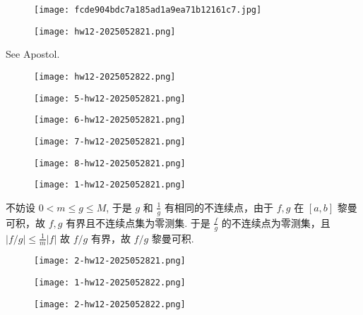 \begin{figure}[H]
\centering
\texttt{[image: fcde904bdc7a185ad1a9ea71b12161c7.jpg]}
\label{}
\end{figure}

\begin{exercise}
\begin{figure}[H]
\centering
\texttt{[image: hw12-2025052821.png]}
\label{}
\end{figure}
\end{exercise}
See Apostol.
\begin{figure}[H]
\centering
\texttt{[image: hw12-2025052822.png]}
\label{}
\end{figure}

\begin{figure}[H]
\centering
\texttt{[image: 5-hw12-2025052821.png]}
\label{}
\end{figure}
\begin{figure}[H]
\centering
\texttt{[image: 6-hw12-2025052821.png]}
\label{}
\end{figure}
\begin{figure}[H]
\centering
\texttt{[image: 7-hw12-2025052821.png]}
\label{}
\end{figure}
\begin{figure}[H]
\centering
\texttt{[image: 8-hw12-2025052821.png]}
\label{}
\end{figure}

\begin{exercise}
\begin{figure}[H]
\centering
\texttt{[image: 1-hw12-2025052821.png]}
\label{}
\end{figure}
\end{exercise}
不妨设 $0<m\leq g\leq M$, 于是 $g$ 和 $\frac{1}{g}$ 有相同的不连续点，由于 $f,g$ 在 $[a,b]$ 黎曼可积，故 $f, g$ 有界且不连续点集为零测集. 于是 $\frac{f}{g}$ 的不连续点为零测集，且 $\lvert f/g \rvert\leq\frac{1}{m}\lvert f \rvert$ 故 $f/g$ 有界，故 $f/g$ 黎曼可积.

\begin{exercise}
\begin{figure}[H]
\centering
\texttt{[image: 2-hw12-2025052821.png]}
\label{}
\end{figure}
\end{exercise}
\begin{figure}[H]
\centering
\texttt{[image: 1-hw12-2025052822.png]}
\label{}
\end{figure}
\begin{figure}[H]
\centering
\texttt{[image: 2-hw12-2025052822.png]}
\label{}
\end{figure}

